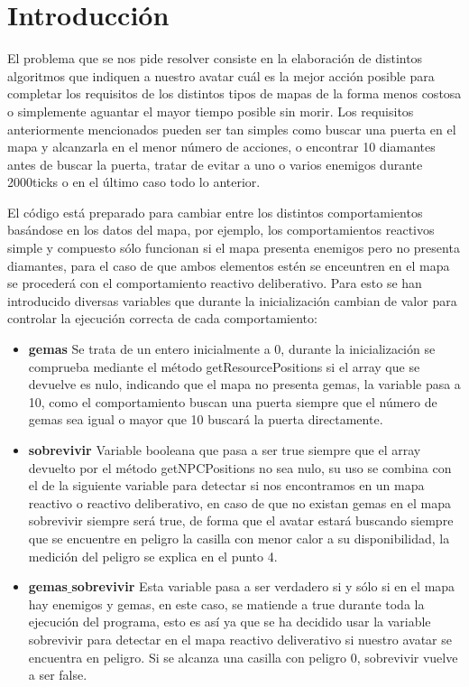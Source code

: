 \section{Introducción}
El problema que se nos pide resolver consiste en la elaboración de distintos algoritmos que indiquen a nuestro avatar cuál es la mejor acción posible para completar los requisitos de los distintos tipos de mapas de la forma menos costosa o simplemente aguantar el mayor tiempo posible sin morir. Los requisitos anteriormente mencionados pueden ser tan simples como buscar una puerta en el mapa y alcanzarla en el menor número de acciones, o encontrar 10 diamantes antes de buscar la puerta, tratar de evitar a uno o varios enemigos durante 2000ticks o en el último caso todo lo anterior.

El código está preparado para cambiar entre los distintos comportamientos basándose en los datos del mapa, por ejemplo, los comportamientos reactivos simple y compuesto sólo funcionan si el mapa presenta enemigos pero no presenta diamantes, para el caso de que ambos elementos estén se enceuntren en el mapa se procederá con el comportamiento reactivo deliberativo. Para esto se han introducido diversas variables que durante la inicialización cambian de valor para controlar la ejecución correcta de cada comportamiento:

\begin{itemize}
\item \textbf{gemas} Se trata de un entero inicialmente a 0, durante la inicialización se comprueba mediante el método getResourcePositions si el array que se devuelve es nulo, indicando que el mapa no presenta gemas, la variable pasa a 10, como el comportamiento buscan una puerta siempre que el número de gemas sea igual o mayor que 10 buscará la puerta directamente.
\item \textbf{sobrevivir} Variable booleana que pasa a ser true siempre que el array devuelto por el método getNPCPositions no sea nulo, su uso se combina con el de la siguiente variable para detectar si nos encontramos en un mapa reactivo o reactivo deliberativo, en caso de que no existan gemas en el mapa sobrevivir siempre será true, de forma que el avatar estará buscando siempre que se encuentre en peligro la casilla con menor calor a su disponibilidad, la medición del peligro se explica en el punto 4.
\item \textbf{gemas$\_$sobrevivir} Esta variable pasa a ser verdadero si y sólo si en el mapa hay enemigos y gemas, en este caso, se matiende a true durante toda la ejecución del programa, esto es así ya que se ha decidido usar la variable sobrevivir para detectar en el mapa reactivo deliverativo si nuestro avatar se encuentra en peligro. Si se alcanza una casilla con peligro 0, sobrevivir vuelve a ser false.
\end{itemize}

